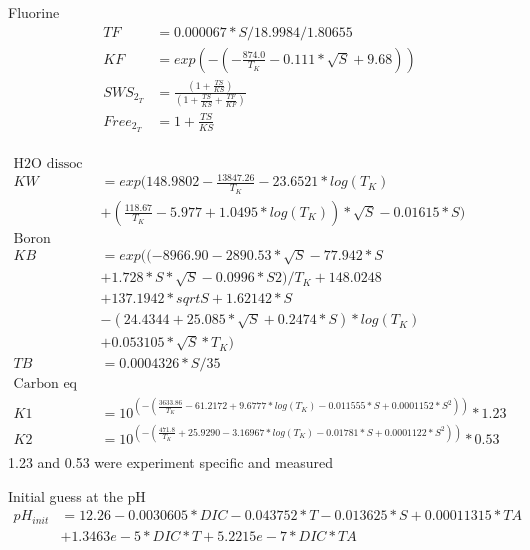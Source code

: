 \documentclass{ruthesis}
\begin{document}
Fluorine
\begin{align*}
TF       	&= 0.000067*S/18.9984/1.80655 \nonumber \\
KF       	&= exp(-(-\frac{874.0}{T_K} - 0.111*\sqrt{S} + 9.68)) \nonumber \\
SWS_{2_T}  	&= \frac{(1 + \frac{TS}{KS})}{(1 + \frac{TS}{KS} + \frac{TF}{KF})} \nonumber \\
Free_{2_T} 	&= 1 + \frac{TS}{KS} \nonumber \\
\end{align*}


\begin{align*}
\text{H2O dissoc} \nonumber \\
KW 		&= exp(148.9802 - \frac{13847.26}{T_K}  - 23.6521*log(T_K) \nonumber \\
		&+ (\frac{118.67}{T_K} - 5.977 + 1.0495*log(T_K))*\sqrt{S} - 0.01615*S) \nonumber \\
\text{Boron} \nonumber \\
KB 		&= exp((-8966.90 - 2890.53*\sqrt{S} - 77.942*S \nonumber \\
		&+ 1.728*S*\sqrt{S} - 0.0996*S2)/T_K + 148.0248 \nonumber \\
		& + 137.1942*sqrtS + 1.62142*S \nonumber \\
		&- (24.4344 + 25.085*\sqrt{S} + 0.2474*S)*log(T_K)  \nonumber \\ 
		&+ 0.053105*\sqrt{S}*T_K) \nonumber \\
TB 		&= 0.0004326*S/35 \nonumber \\
\text{Carbon eq constants} \nonumber \\
K1 		&= 10^{(-(\frac{3633.86}{T_K} - 61.2172 + 9.6777 *log(T_K) - 0.011555*S + 0.0001152*S^2))}*1.23	\nonumber \\
K2 		&= 10^{(-(\frac{471.8}{T_K} + 25.9290 - 3.16967*log(T_K) - 0.01781*S + 0.0001122*S^2))}*0.53 \nonumber \\	
\end{align*}
1.23 and 0.53 were experiment specific and measured 


Initial guess at the pH 
\begin{align*}
pH_{init} 	&= 12.26 -0.0030605*DIC -0.043752*T -0.013625*S+ 0.00011315*TA \nonumber \\
&+ 1.3463e-5*DIC*T + 5.2215e-7*DIC*TA \nonumber \\
\end{align*}
\end{document}
